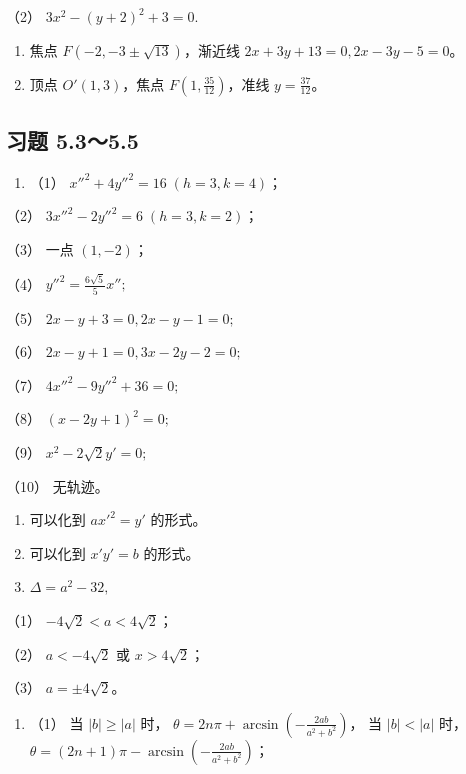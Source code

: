 （2） \(3x^{2} - (y + 2)^{2} + 3 = 0.\)

\begin{enumerate}
\def\labelenumi{\arabic{enumi}.}
\setcounter{enumi}{6}
\item
  焦点 \(F(-2, -3 \pm \sqrt{13})\)，渐近线
  \(2x + 3y + 13 = 0, 2x - 3y - 5 = 0\)。
\item
  顶点 \(O'(1,3)\)，焦点 \(F(1,\frac{35}{12})\)，准线
  \(y = \frac{37}{12}\)。
\end{enumerate}

\subsection{习题 5.3～5.5}\label{ux4e60ux9898-5.35.5}

\begin{enumerate}
\def\labelenumi{\arabic{enumi}.}
\tightlist
\item
  （1） \(x''^{2} + 4y''^{2} = 16\;(h = 3, k = 4)\)；
\end{enumerate}

（2） \(3x''^{2} - 2y''^{2} = 6\;(h = 3, k = 2)\)；

（3） 一点 \((1, -2)\)；

（4） \(y''^{2} = \frac{6\sqrt{5}}{5} x'';\)

（5） \(2x - y + 3 = 0, 2x - y - 1 = 0;\)

（6） \(2x - y + 1 = 0, 3x - 2y - 2 = 0;\)

（7） \(4x''^{2} - 9y''^{2} + 36 = 0;\)

（8） \((x - 2y + 1)^{2} = 0;\)

（9） \(x^{2} - 2\sqrt{2} y' = 0;\)

（10） 无轨迹。

\begin{enumerate}
\def\labelenumi{\arabic{enumi}.}
\setcounter{enumi}{1}
\item
  可以化到 \(ax'^2 = y'\) 的形式。
\item
  可以化到 \(x'y' = b\) 的形式。
\item
  \(\Delta=a^{2}-32,\)
\end{enumerate}

（1） \(-4\sqrt{2} < a < 4\sqrt{2}\)；

（2） \(a < -4\sqrt{2}\) 或 \(x > 4\sqrt{2}\)；

（3） \(a = \pm 4\sqrt{2}\)。

\begin{enumerate}
\def\labelenumi{\arabic{enumi}.}
\setcounter{enumi}{4}
\tightlist
\item
  （1） 当 \(|b| \geqslant |a|\) 时，
  \(\theta = 2n\pi + \arcsin \left(-\frac{2ab}{a^2 + b^2}\right)\)， 当
  \(|b| < |a|\)
  时，\(\theta = (2n + 1)\pi - \arcsin \left(-\frac{2ab}{a^2 + b^2}\right)\)；
\end{enumerate}

